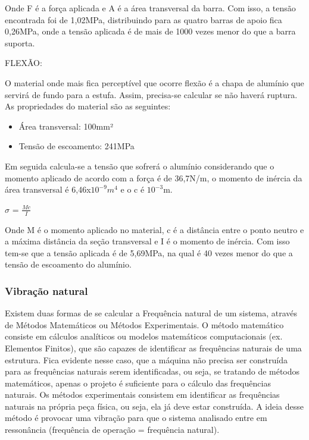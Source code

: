 Onde F é a força aplicada e A é a área transversal da barra. Com isso, a tensão encontrada foi de 1,02MPa,  distribuindo para as quatro barras de apoio fica 0,26MPa, onde a tensão aplicada é de mais de 1000 vezes menor do que a barra suporta. 

FLEXÃO:

O material onde mais fica perceptível que ocorre flexão é a chapa de alumínio que servirá de fundo para a estufa. Assim, precisa-se calcular se não haverá ruptura. As propriedades do material são as seguintes:

\begin{itemize}
	\item Área transversal: 100mm²
	\item Tensão de escoamento: 241MPa
\end{itemize}

Em seguida calcula-se a tensão que sofrerá o alumínio considerando que o momento aplicado de acordo com a força é de 36,7N/m, o momento de inércia da área transversal é 6,46x$10^{-9} m^4$ e o c é $10^{-3}$m.

$\sigma$ = $\frac{Mc}{I}$

Onde M é o momento aplicado no material, c é a distância entre o ponto neutro e a máxima distância da seção transversal e I é o momento de inércia. Com isso tem-se que a tensão aplicada é de 5,69MPa, na qual é 40 vezes menor do que a tensão de escoamento do alumínio.

\subsubsection{Vibração natural}

Existem duas formas de se calcular a Frequência natural de um sistema, através de Métodos Matemáticos ou Métodos Experimentais. O método matemático consiste em cálculos analíticos ou modelos matemáticos computacionais (ex. Elementos Finitos), que são capazes de identificar as frequências naturais de uma estrutura. Fica evidente nesse caso, que a máquina não precisa ser construída para as frequências naturais serem identificadas, ou seja, se tratando de métodos matemáticos, apenas o projeto é suficiente para o cálculo das frequências naturais. Os métodos experimentais consistem em identificar as frequências naturais na própria peça física, ou seja, ela já deve estar construída. A ideia desse método é provocar uma vibração para que o sistema analisado entre em ressonância (frequência de operação = frequência natural). \cite{nobrega2014}

